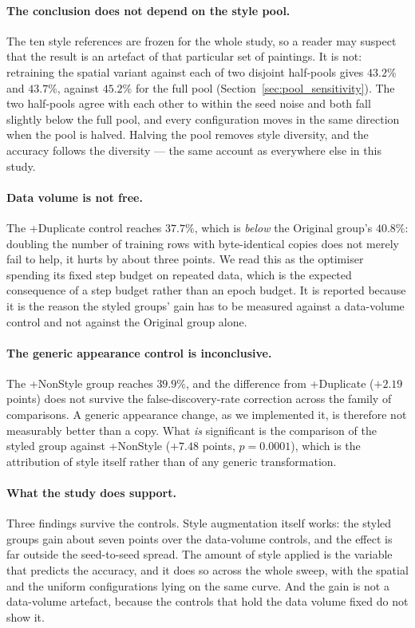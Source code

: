 \paragraph{The conclusion does not depend on the style pool.}
The ten style references are frozen for the whole study, so a reader may
suspect that the result is an artefact of that particular set of paintings.
It is not: retraining the spatial variant against each of two disjoint
half-pools gives $43.2\%$ and $43.7\%$, against $45.2\%$ for the full
pool (Section~\ref{sec:pool_sensitivity}). The two half-pools agree with
each other to within the seed noise and both fall slightly below the full
pool, and every configuration moves in the same direction when the pool is
halved. Halving the pool removes style diversity, and the accuracy follows
the diversity --- the same account as everywhere else in this study.

\paragraph{Data volume is not free.}
The +Duplicate control reaches $37.7\%$, which is \emph{below} the
Original group's $40.8\%$: doubling the number of training rows with
byte-identical copies does not merely fail to help, it hurts by about
three points. We read this as the optimiser spending its fixed step budget
on repeated data, which is the expected consequence of a step budget rather
than an epoch budget. It is reported because it is the reason the styled
groups' gain has to be measured against a data-volume control and not
against the Original group alone.

\paragraph{The generic appearance control is inconclusive.}
The +NonStyle group reaches $39.9\%$, and the difference from +Duplicate
($+2.19$ points) does not survive the false-discovery-rate correction
across the family of comparisons. A generic appearance change, as we
implemented it, is therefore not measurably better than a copy. What
\emph{is} significant is the comparison of the styled group against
+NonStyle ($+7.48$ points, $p = 0.0001$), which is the attribution of
style itself rather than of any generic transformation.

\paragraph{What the study does support.}
Three findings survive the controls. Style augmentation itself works: the
styled groups gain about seven points over the data-volume controls, and the
effect is far outside the seed-to-seed spread. The amount of style applied
is the variable that predicts the accuracy, and it does so across the whole
sweep, with the spatial and the uniform configurations lying on the same
curve. And the gain is not a data-volume artefact, because the controls
that hold the data volume fixed do not show it.

